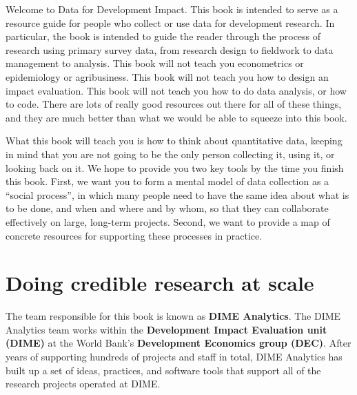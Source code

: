 \begin{fullwidth}
Welcome to Data for Development Impact.
This book is intended to serve as a resource guide
for people who collect or use data for development research.
In particular, the book is intended to guide the reader
through the process of research using primary survey data,
from research design to fieldwork to data management to analysis.
This book will not teach you econometrics or epidemiology or agribusiness.
This book will not teach you how to design an impact evaluation.
This book will not teach you how to do data analysis, or how to code.
There are lots of really good resources out there for all of these things,
and they are much better than what we would be able to squeeze into this book.

What this book will teach you is how to think about quantitative data,
keeping in mind that you are not going to be the only person
collecting it, using it, or looking back on it.
We hope to provide you two key tools by the time you finish this book.
First, we want you to form a mental model of data collection as a ``social process'',
in which many people need to have the same idea about what is to be done, and when and where and by whom,
so that they can collaborate effectively on large, long-term projects.
Second, we want to provide a map of concrete resources for supporting these processes in practice.
\end{fullwidth}


\section{Doing credible research at scale}

The team responsible for this book is known as \textbf{DIME Analytics}.
The DIME Analytics team works within the \textbf{Development Impact Evaluation unit (DIME)}
at the World Bank's \textbf{Development Economics group (DEC)}.
After years of supporting hundreds of projects and staff in total,
DIME Analytics has built up a set of ideas, practices, and software tools
that support all of the research projects operated at DIME.

